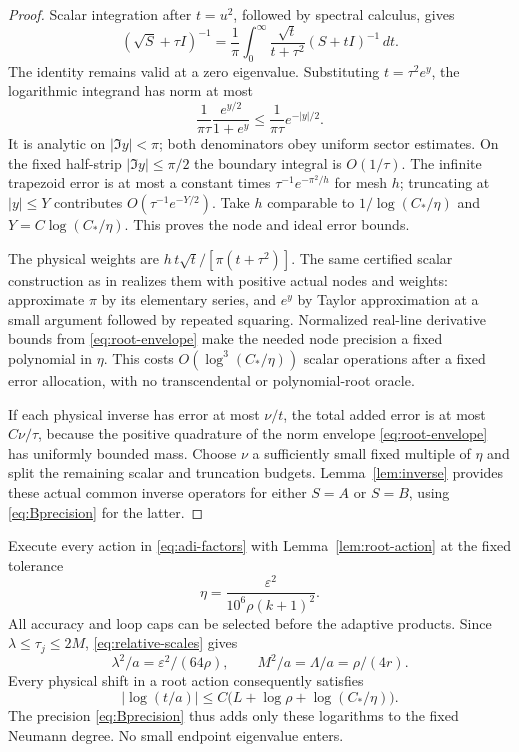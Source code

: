 \documentclass[11pt]{article}
\numberwithin{equation}{section}
\begin{document}
\begin{proof}
Scalar integration after $t=u^2$, followed by spectral calculus, gives
\begin{equation}\label{eq:root-stieltjes}
 (\sqrt S+\tau I)^{-1}
  =\frac1\pi\int_0^\infty
           \frac{\sqrt t}{t+\tau^2}(S+tI)^{-1}\,dt.
\end{equation}
The identity remains valid at a zero eigenvalue. Substituting
$t=\tau^2e^y$, the logarithmic integrand has norm at most
\begin{equation}\label{eq:root-envelope}
 \frac1{\pi\tau}\frac{e^{y/2}}{1+e^y}
                         \le\frac1{\pi\tau}e^{-|y|/2}.
\end{equation}
It is analytic on $|\Im y|<\pi$; both denominators obey uniform
sector estimates. On the fixed half-strip $|\Im y|\le\pi/2$ the
boundary integral is $O(1/\tau)$. The infinite trapezoid error is at
most a constant times $\tau^{-1}e^{-\pi^2/h}$ for mesh $h$; truncating
at $|y|\le Y$ contributes $O(\tau^{-1}e^{-Y/2})$. Take
$h$ comparable to $1/\log(C_*/\eta)$ and
$Y=C\log(C_*/\eta)$. This proves the node and ideal error bounds.

The physical weights are
$h\,t\sqrt t/[\pi(t+\tau^2)]$. The same certified scalar
construction as in \cite[Lemma~5.1]{Raw} realizes them with positive
actual nodes and weights: approximate $\pi$ by its elementary series,
and $e^y$ by Taylor approximation at a small argument followed by
repeated squaring. Normalized real-line derivative bounds from
\eqref{eq:root-envelope} make the needed node precision a fixed
polynomial in $\eta$. This costs $O(\log^3(C_*/\eta))$ scalar
operations after a fixed error allocation, with no transcendental or
polynomial-root oracle.

If each physical inverse has error at most $\nu/t$, the total added
error is at most $C\nu/\tau$, because the positive quadrature of the
norm envelope \eqref{eq:root-envelope} has uniformly bounded mass.
Choose $\nu$ a sufficiently small fixed multiple of $\eta$ and split
the remaining scalar and truncation budgets. Lemma~\ref{lem:inverse}
provides these actual common inverse operators for either $S=A$ or
$S=B$, using \eqref{eq:Bprecision} for the latter.
\end{proof}

Execute every action in \eqref{eq:adi-factors} with
Lemma~\ref{lem:root-action} at the fixed tolerance
\begin{equation}\label{eq:eta}
 \eta=\frac{\varepsilon^2}{10^6\rho(k+1)^2}.
\end{equation}
All accuracy and loop caps can be selected before the adaptive products.
Since $\lambda\le\tau_j\le2M$, \eqref{eq:relative-scales} gives
\begin{equation}\label{eq:tau-range}
 \lambda^2/a=\varepsilon^2/(64\rho),\qquad
 M^2/a=\Lambda/a=\rho/(4r).
\end{equation}
Every physical shift in a root action consequently satisfies
\begin{equation}\label{eq:shift-range}
 |\log(t/a)|\le C\bigl(L+\log\rho+\log(C_*/\eta)\bigr).
\end{equation}
The precision \eqref{eq:Bprecision} thus adds only these logarithms to
the fixed Neumann degree. No small endpoint eigenvalue enters.
\end{document}
